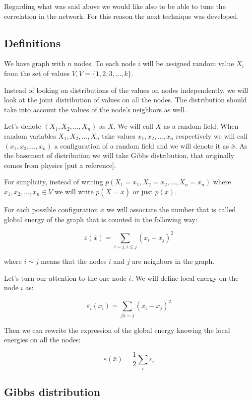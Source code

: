 \documentclass[12pt]{report}
\begin{document}
Regarding what was said above we would like also to be able to tune the correlation in the network. For this reason the next technique was developed.
 
\subsection{Definitions}

We have graph with $n$ nodes. To each node $i$ will be assigned random value $X_i$ from the set of values $V, V = \lbrace 1, 2, 3, ..., k \rbrace$. 

Instead of looking on distributions of the values on nodes independently, we will look at the joint distribution of values on all the nodes. The distribution should take into account the values of the node's neighbors as well.

Let's denote $(X_1, X_2, ..., X_n)$ as $\bar{X}$. We will call $\bar{X}$ as a random field. When random variables $X_1, X_2, ..., X_n$ take values $x_1, x_2, ..., x_n$ respectively we will call $(x_1, x_2, ..., x_n)$ a configuration of a random field and we will denote it as $\bar{x}$. As the basement of distribution we will take Gibbs distribution, that originally comes from physics [put a reference].

For simplicity, instead of writing $p(X_1 = x_1, X_2 = x_2, ...,  X_n = x_n)$ where $x_1, x_2, ..., x_n \in V$ we will write $p(\bar{X} = \bar{x})$ or just $p(\bar{x})$.

For each possible configuration $\bar{x}$ we will associate the number that is called global energy of the graph that is counted in the following way:

$$ \varepsilon (\bar{x}) =  \sum\limits_{i \sim j, i \leq j} (x_i - x_j)^2  $$


where $i \sim j$ means that the nodes $i$ and $j$ are neighbors in the graph.

Let's turn our attention to the one node $i$. We will define local energy on the node $i$ as:

$$ \varepsilon_i (x_i) = \sum\limits_{j | i \sim j}  (x_i - x_j)^2 $$  

Then we can rewrite the expression of the global energy knowing the local energies on all the nodes:

$$ \varepsilon (\bar{x}) = \frac{1}{2}\sum_i \varepsilon_i$$


\subsection{Gibbs distribution}
\end{document}
